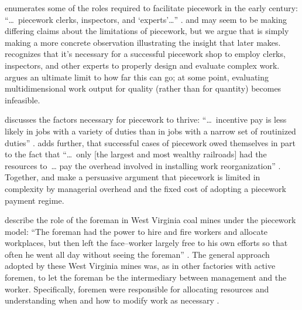 \documentclass[trackingWork]{subfiles}
\begin{document}
\citeauthor{10.2307/23702539} enumerates some of the roles required
to facilitate piecework in the early  century:
    ``\dots~piecework clerks, inspectors, and `experts'\dots''
\cite{hart2016rise,10.2307/23702539}.
\citeauthor{10.2307/23702539} and \citeauthor{hart2016rise} may seem
to be making differing claims about the limitations of piecework, but
we argue that \citeauthor{10.2307/23702539}
is simply making a more concrete observation illustrating the insight that
\citeauthor{hart2016rise} later makes.
\citeauthor{10.2307/23702539} recognizes that
it's necessary for a successful piecework shop to employ
clerks,
inspectors, and
other experts to properly design and evaluate complex work.
\citeauthor{hart2016rise} argues an ultimate limit to how far this can go;
at some point, evaluating multidimensional work output for quality
(rather than for quantity) becomes infeasible.




\citeauthor{Brown01041990} discusses the factors necessary for piecework to thrive:
    ``\dots~incentive pay is less likely in jobs with
    a variety of duties than in jobs with a narrow set of routinized duties''
\cite{Brown01041990}.
\citeauthor{10.2307/23702539} adds further, that
successful cases of piecework owed themselves in part to the fact that
    ``\dots~only [the largest and most wealthy railroads] had the resources to~\dots
    pay the overhead involved in installing work reorganization''
\cite{10.2307/23702539}.
Together, \citeauthor{10.2307/23702539} and \citeauthor{Brown01041990}
make a persuasive argument that piecework is limited in complexity by
managerial overhead and the fixed cost of adopting a piecework payment regime.

\citeauthor{10.2307/2118435} describe the role of the foreman in West Virginia coal mines under the piecework model:
``The foreman had the power to hire and fire workers and allocate workplaces,
but then left the face--worker largely free to his own efforts so that
often he went all day without seeing the foreman''
\cite{10.2307/2118435}.
The general approach adopted by these West Virginia mines was,
as in other factories with active foremen,
to let the foreman be the intermediary between management and the worker.
Specifically, foremen were responsible for allocating resources and
understanding when and how to modify work as necessary
\cite{wray1949marginal}.
\end{document}
